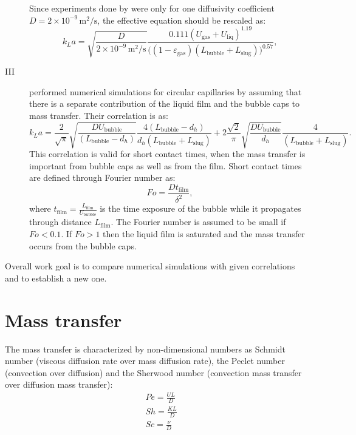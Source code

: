 \documentclass{article}
\begin{document}
\begin{description}
Since experiments done by \citeauthor{bercic-mass} were only for one diffusivity coefficient
$D=2\times 10^{-9}\,\mathrm{m^2/s}$, the effective equation should be rescaled as:
\begin{equation}
k_L a = \sqrt{\frac{D}{2\times 10^{-9}\,\mathrm{m^2/s}}}\frac{0.111
(U_{\mathrm{gas}}+U_{\mathrm{liq}})^{1.19}}{\bigl((1-\varepsilon_{\mathrm{gas}})(L_{\mathrm{bubble}}
+L_ {\mathrm{slug}} )\bigr)^{0.57} },
\end{equation}

\item[III]
\citet{vanbaten-circular} performed numerical simulations for circular capillaries by assuming that
there is a separate contribution of the liquid film and the bubble caps to mass transfer. Their
correlation is as:
\begin{equation}
k_L a = \frac{2}{\sqrt{\pi}}\sqrt{\frac{D U_{\mathrm{bubble}}}{(L_{\mathrm{bubble}}-d_h)}}
\frac{4(L_{\mathrm{bubble}}-d_h)}{d_h(L_{\mathrm{bubble}}+L_{\mathrm{slug}})}+2\frac{\sqrt{2}}{\pi}
 \sqrt{\frac{D U_{\mathrm{bubble}}}{d_h}} \frac{4}{(L_{\mathrm{bubble}}+L_{\mathrm{slug}})}.
\end{equation}
This correlation is valid for short contact times, when the mass transfer is important from bubble
caps as well as from the film. Short contact times are defined through Fourier number as:
\begin{equation}
Fo=\frac{D t_{\mathrm{film}}}{\delta^2},
\end{equation}
where $t_{\mathrm{film}}=\frac{L_{\mathrm{film}}}{U_{\mathrm{bubble}}}$ is the time exposure of the
bubble while it propagates through distance $L_{\mathrm{film}}$. The Fourier number is assumed to
be small if $Fo<0.1$. If $Fo>1$ then the liquid film is saturated and the mass transfer occurs from
the bubble caps.

\end{description}

Overall work goal is to compare numerical simulations with given correlations and to establish a
new one.

\section{Mass transfer}
The mass transfer is characterized by non-dimensional numbers as Schmidt number (viscous diffusion
rate over mass diffusion rate), the Peclet number (convection over diffusion) and the Sherwood
number (convection mass transfer over diffusion mass transfer):
\begin{equation}
\begin{aligned}
&Pe=\frac{U L}{D}\\
&Sh=\frac{K L}{D}\\
&Sc=\frac{\nu}{D}\\
\end{aligned}
\end{equation}
\end{document}
